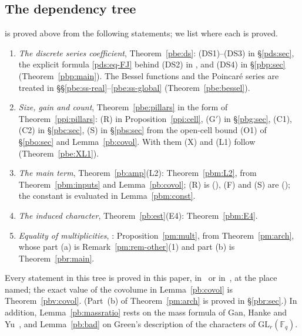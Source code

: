 \documentclass[10pt]{amsart}
\theoremstyle{definition}
\theoremstyle{remark}
\providecommand{\auF}{\mathbb F}
\providecommand{\auGL}{\mathrm{GL}}
\begin{document}
\subsection{The dependency tree}\label{pb:ss-remains}

{\cite[Theorem~14.14]{P46}} is proved above from the following statements; we list where each is proved.

\begin{enumerate}
\item[(R1)] \emph{The discrete series coefficient}, Theorem~\ref{pbe:ds}: \textup{(DS1)}--\textup{(DS3)} in
\S\ref{pds:sec}, the explicit formula \eqref{pds:eq-FJ} behind \textup{(DS2)} in {\cite[Theorem~3.17]{P49}}, and
\textup{(DS4)} in \S\ref{pbp:sec} (Theorem~\ref{pbp:main}). The Bessel functions and the Poincar\'e series
are treated in \S\S\ref{pbe:ss-real}--\ref{pbe:ss-global} (Theorem~\ref{pbe:bessel}).
\item[(R2)] \emph{Size, gain and count}, Theorem~\ref{pbe:pillars} in the form of
Theorem~\ref{ppi:pillars}: \textup{(R)} in Proposition~\ref{ppi:cell}, \textup{(G$'$)} in
\S\ref{pbg:sec}, \textup{(C1)}, \textup{(C2)} in \S\ref{pbc:sec}, \textup{(S)} in \S\ref{pbs:sec} from the
open-cell bound \textup{(O1)} of \S\ref{pbo:sec} and Lemma~\ref{pb:covol}. With them \textup{(X)} and
\textup{(L1)} follow (Theorem~\ref{pbe:XL1}).
\item[(R4)] \emph{The main term}, Theorem~\ref{pb:amp}\textup{(L2)}: Theorem~\ref{pbm:L2}, from
Theorem~\ref{pbm:inputs} and Lemma~\ref{pb:covol}; \textup{(R)} is {\cite[Theorem~2.17]{P52}}
({\cite[\S\S2, 3 and~4]{P52}}), \textup{(F)} and \textup{(S)} are {\cite[Theorems~5.28 and~5.29]{P52}} ({\cite[\S\S5 and~6]{P52}}); the constant is evaluated in Lemma~\ref{pbm:const}.
\item[(R5)] \emph{The induced character}, Theorem~\ref{pb:est}\textup{(E4)}: Theorem~\ref{pbm:E4}.
\item[(R6)] \emph{Equality of multiplicities}, {\cite[Proposition~14.36]{P46}}: Proposition~\ref{pm:mult}, from
Theorem~\ref{pm:arch}, whose part (a) is Remark~\ref{pm:rem-other}(1) and part (b) is
Theorem~\ref{pbr:main}.
\end{enumerate}
Every statement in this tree is proved in this paper, in~\cite{P49} or in~\cite{P52}, at the place named; the exact value of the covolume in
Lemma~\ref{pb:covol} is Theorem~\ref{pbv:covol}. (Part~(b) of Theorem~\ref{pm:arch} is proved in \S\ref{pbr:sec}.) In addition, Lemma~\ref{pb:massratio} rests on the mass formula of Gan, Hanke
and Yu~\cite[Propositions~4.4--4.5]{GHY}, and Lemma~\ref{pb:bad} on Green's description of
the characters of $\auGL_r(\auF_q)$.
\end{document}

